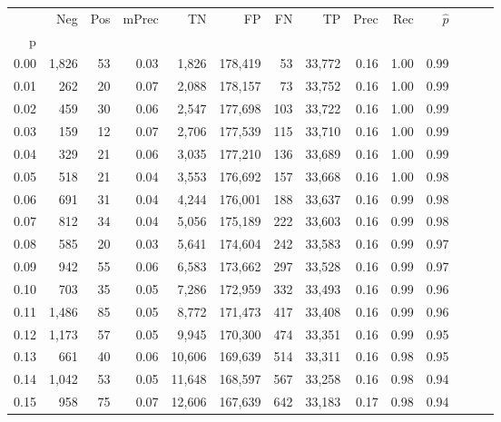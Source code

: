 \begin{tabular}{rrrrrrrrrrrrrr}
\toprule
{} &    Neg &  Pos & mPrec &       TN &       FP &      FN &      TP &  Prec &   Rec & $\hat{p}$ \\
p    &        &      &       &          &          &         &         &       &       &           \\
\midrule
0.00 &  1,826 &   53 &  0.03 &    1,826 &  178,419 &      53 &  33,772 &  0.16 &  1.00 &      0.99 \\
0.01 &    262 &   20 &  0.07 &    2,088 &  178,157 &      73 &  33,752 &  0.16 &  1.00 &      0.99 \\
0.02 &    459 &   30 &  0.06 &    2,547 &  177,698 &     103 &  33,722 &  0.16 &  1.00 &      0.99 \\
0.03 &    159 &   12 &  0.07 &    2,706 &  177,539 &     115 &  33,710 &  0.16 &  1.00 &      0.99 \\
0.04 &    329 &   21 &  0.06 &    3,035 &  177,210 &     136 &  33,689 &  0.16 &  1.00 &      0.99 \\
0.05 &    518 &   21 &  0.04 &    3,553 &  176,692 &     157 &  33,668 &  0.16 &  1.00 &      0.98 \\
0.06 &    691 &   31 &  0.04 &    4,244 &  176,001 &     188 &  33,637 &  0.16 &  0.99 &      0.98 \\
0.07 &    812 &   34 &  0.04 &    5,056 &  175,189 &     222 &  33,603 &  0.16 &  0.99 &      0.98 \\
0.08 &    585 &   20 &  0.03 &    5,641 &  174,604 &     242 &  33,583 &  0.16 &  0.99 &      0.97 \\
0.09 &    942 &   55 &  0.06 &    6,583 &  173,662 &     297 &  33,528 &  0.16 &  0.99 &      0.97 \\
0.10 &    703 &   35 &  0.05 &    7,286 &  172,959 &     332 &  33,493 &  0.16 &  0.99 &      0.96 \\
0.11 &  1,486 &   85 &  0.05 &    8,772 &  171,473 &     417 &  33,408 &  0.16 &  0.99 &      0.96 \\
0.12 &  1,173 &   57 &  0.05 &    9,945 &  170,300 &     474 &  33,351 &  0.16 &  0.99 &      0.95 \\
0.13 &    661 &   40 &  0.06 &   10,606 &  169,639 &     514 &  33,311 &  0.16 &  0.98 &      0.95 \\
0.14 &  1,042 &   53 &  0.05 &   11,648 &  168,597 &     567 &  33,258 &  0.16 &  0.98 &      0.94 \\
0.15 &    958 &   75 &  0.07 &   12,606 &  167,639 &     642 &  33,183 &  0.17 &  0.98 &      0.94 \\

\end{tabular}
